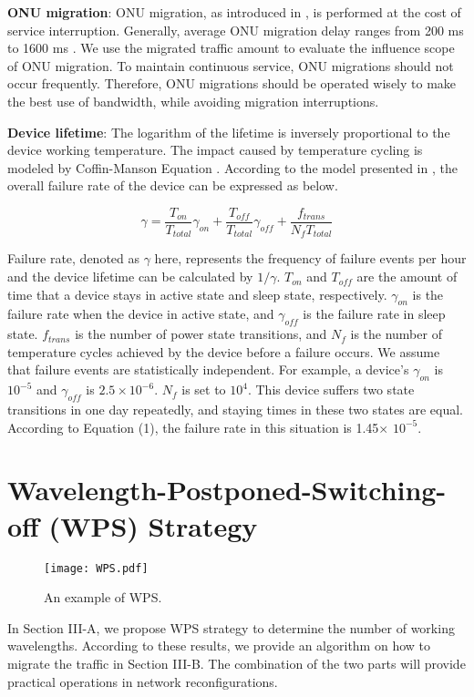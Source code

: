 \documentclass[letter]{IEEEtran}
\begin{document}
\textbf{ONU migration}: ONU migration, as introduced in \cite{wang2014energy}, is performed at the cost of service interruption. Generally, average ONU migration delay ranges from 200 ms to 1600 ms \cite{Li:14}. We use the migrated traffic amount to evaluate the influence scope of ONU migration. To maintain continuous service, ONU migrations should not occur frequently. Therefore, ONU migrations should be operated wisely to make the best use of bandwidth, while avoiding migration interruptions.

\textbf{Device lifetime}: The logarithm of the lifetime is inversely proportional to the device working temperature. The impact caused by temperature cycling is modeled by Coffin-Manson Equation \cite{manson1954behavior}. According to the model presented in \cite{7105670}, the overall failure rate of the device can be expressed as below.

\begin{footnotesize}
\begin{equation}
\gamma = \frac{T_{on}}{T_{total}}\gamma_{on} + \frac{T_{off}}{T_{total}}\gamma_{off} + \frac{f_{trans}}{N_{f}T_{total}}
\end{equation}
\end{footnotesize}
Failure rate, denoted as $ \gamma $ here, represents the frequency of failure events per hour and the device lifetime can be calculated by $1 /\gamma$. $T_{on}$ and $T_{off}$ are the amount of time that a device stays in active state and sleep state, respectively. $\gamma_{on}$ is the failure rate when the device in active state, and $\gamma_{off}$ is the failure rate in sleep state. $f_{trans}$ is the number of power state transitions, and $N_{f}$ is the number of temperature cycles achieved by the device before a failure occurs. We assume that failure events are statistically independent. For example, a device's $\gamma_{on}$ is $ 10^{-5}$ and $\gamma_{off}$ is $ 2.5\times10^{-6}$.  $ N_{f} $ is set to $ 10^{4}$. This device suffers two state transitions in one day repeatedly, and staying times in these two states are equal. According to Equation (1), the failure rate in this situation is 1.45$ \times $ $ 10^{-5}$.

\section{Wavelength-Postponed-Switching-off (WPS) Strategy}
\begin{figure}[t]
    \centering 
        \texttt{[image: WPS.pdf]}\\ 
    \caption{ An example of WPS.}
    \label{WPS}
    \vspace{-6.0mm}
\end{figure}
In Section III-A, we propose WPS strategy to determine the number of working wavelengths. According to these results, we provide an algorithm on how to migrate the traffic in Section III-B. The combination of the two parts will provide practical operations in network reconfigurations.
\end{document}
